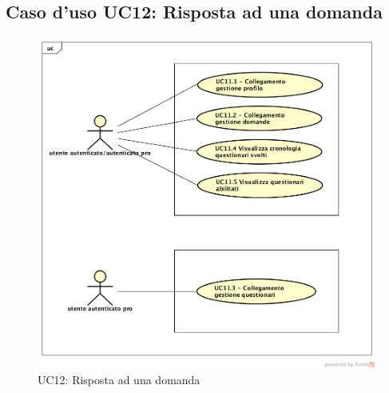 \newpage
\subsection{Caso d'uso UC12: Risposta ad una domanda}
\label{UC11}
\begin{figure}[h]
	\centering
	\includegraphics[scale=0.5]{UML/UC11.png}
	\caption{UC12: Risposta ad una domanda}
\end{figure}